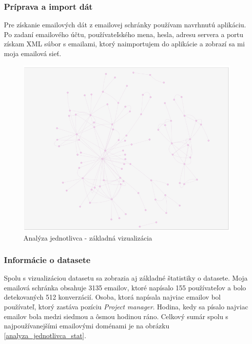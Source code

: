 \documentclass[slovak,master,public,dept460,male,cpdeclaration,oneside]{diploma}
\begin{document}
\subsubsection{Príprava a import dát}
Pre získanie emailových dát z emailovej schránky používam navrhnutú aplikáciu. Po zadaní emailového účtu, používateľského mena, hesla, adresu servera a portu získam XML súbor s emailami, ktorý naimportujem do aplikácie a zobrazí sa mi moja emailová sieť.


\begin{figure}[H]
\centering
\includegraphics[width=13cm, height=9cm]{figures/analyza_jednotlivca_net}
\caption{Analýza jednotlivca - základná vizualizácia}
\label{team_brokerage_graph}
\end{figure}

\subsubsection{Informácie o datasete}
Spolu s vizualizáciou datasetu sa zobrazia aj základné štatistiky o datasete. Moja emailová schránka obsahuje 3135 emailov, ktoré napísalo 155 používateľov a bolo detekovaných 512 konverzácií. Osoba, ktorá napísala najviac emailov bol používateľ, ktorý zastáva pozíciu \textit{Project manager}. Hodina, kedy sa písalo najviac emailov bola medzi siedmou a ôsmou hodinou ráno. Celkový sumár spolu s najpoužívanejšími emailovými doménami je na obrázku \ref{analyza_jednotlivca_stat}.
\end{document}
